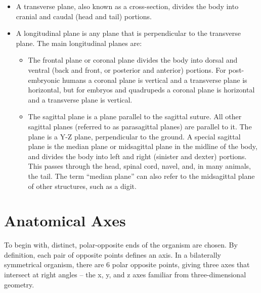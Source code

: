 \begin{itemize}
\tightlist
\item
  A transverse plane, also known as a cross-section, divides the body into cranial and caudal (head and tail) portions.
\item
  A longitudinal plane is any plane that is perpendicular to the transverse plane. The main longitudinal planes are:

  \begin{itemize}
  \tightlist
  \item
    The frontal plane or coronal plane divides the body into dorsal and ventral (back and front, or posterior and anterior) portions. For post-embryonic humans a coronal plane is vertical and a transverse plane is horizontal, but for embryos and quadrupeds a coronal plane is horizontal and a transverse plane is vertical.
  \item
    The sagittal plane is a plane parallel to the sagittal suture. All other sagittal planes (referred to as parasagittal planes) are parallel to it. The plane is a Y-Z plane, perpendicular to the ground. A special sagittal plane is the median plane or midsagittal plane in the midline of the body, and divides the body into left and right (sinister and dexter) portions. This passes through the head, spinal cord, navel, and, in many animals, the tail. The term ``median plane'' can also refer to the midsagittal plane of other structures, such as a digit.
  \end{itemize}
\end{itemize}

\hypertarget{anatomical-axes}{%
\section{Anatomical Axes}\label{anatomical-axes}}

To begin with, distinct, polar-opposite ends of the organism are chosen. By definition, each pair of opposite points defines an axis. In a bilaterally symmetrical organism, there are 6 polar opposite points, giving three axes that intersect at right angles -- the x, y, and z axes familiar from three-dimensional geometry.

